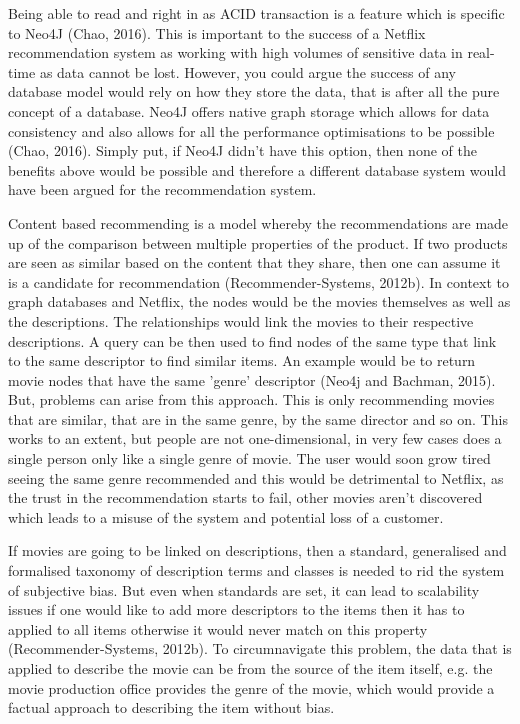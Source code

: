 \documentclass[a4paper]{article}
\begin{document}
Being able to read and right in as ACID transaction is a feature which is specific to Neo4J (Chao, 2016). This is important to the success of a Netflix recommendation system as working with high volumes of sensitive data in real-time as data cannot be lost. However, you could argue the success of any database model would rely on how they store the data, that is after all the pure concept of a database. Neo4J offers native graph storage which allows for data consistency and also allows for all the performance optimisations to be possible (Chao, 2016). Simply put, if Neo4J didn't have this option, then none of the benefits above would be possible and therefore a different database system would have been argued for the recommendation system. \par

Content based recommending is a model whereby the recommendations are made up of the comparison between multiple properties of the product. If two products are seen as similar based on the content that they share, then one can assume it is a candidate for recommendation (Recommender-Systems, 2012b). In context to graph databases and Netflix, the nodes would be the movies themselves as well as the descriptions. The relationships would link the movies to their respective descriptions. A query can be then used to find nodes of the same type that link to the same descriptor to find similar items. An example would be to return movie nodes that have the same 'genre' descriptor (Neo4j and Bachman, 2015). But, problems can arise from this approach. This is only recommending movies that are similar, that are in the same genre, by the same director and so on. This works to an extent, but people are not one-dimensional, in very few cases does a single person only like a single genre of movie. The user would soon grow tired seeing the same genre recommended and this would be detrimental to Netflix, as the trust in the recommendation starts to fail, other movies aren't discovered which leads to a misuse of the system and potential loss of a customer.

If movies are going to be linked on descriptions, then a standard, generalised and formalised taxonomy of description terms and classes is needed to rid the system of subjective bias. But even when standards are set, it can lead to scalability issues if one would like to add more descriptors to the items then it has to applied to all items otherwise it would never match on this property (Recommender-Systems, 2012b). To circumnavigate this problem, the data that is applied to describe the movie can be from the source of the item itself, e.g. the movie production office provides the genre of the movie, which would provide a factual approach to describing the item without bias.
\end{document}
